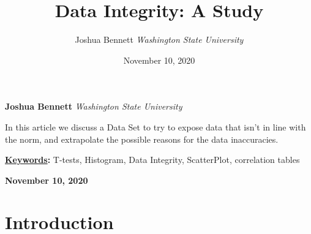 \documentclass[]{article}
\title{\textbf{\textcolor{WSU.crimson}{Data Integrity: A Study}}  }
\author{\Large Joshua
Bennett\vspace{0.05in} \newline\normalsize\emph{Washington State
University}  }
\date{November 10, 2020}
\newcommand*{\authorfont}{\fontfamily{phv}\selectfont}
\renewenvironment{abstract}
 {{%
    \setlength{\leftmargin}{0mm}
    \setlength{\rightmargin}{\leftmargin}%
  }%
  \relax}
 {\endlist}
\begin{document}
	
%    


{%
\setlength{\parindent}{0pt}
\thispagestyle{plain}
{\fontsize{18}{20}\selectfont\raggedright 
\maketitle  %

}

{
   \vskip 13.5pt\relax \normalsize\fontsize{11}{12} 
   
\textbf{\authorfont Joshua Bennett} \hskip 15pt \emph{\small Washington
State University}   

}

}








\begin{abstract}

    \hbox{\vrule height .2pt width 39.14pc}

    \vskip 8.5pt %

\noindent In this article we discuss a Data Set to try to expose data
that isn't in line with the norm, and extrapolate the possible reasons
for the data inaccuracies.


\vskip 8.5pt \noindent \textbf{\underline{Keywords}:} T-tests,
Histogram, Data Integrity, ScatterPlot, correlation tables \par

    




    
    \hbox{\vrule height .2pt width 39.14pc}
    \vskip 5pt 
    \hfill \textbf{\textcolor{WSU.gray}{ November 10, 2020 } }
    \vskip 5pt 
    
\end{abstract}


\vskip -8.5pt




\noindent  

\section{Introduction}
\label{sec:intro}
\end{document}
